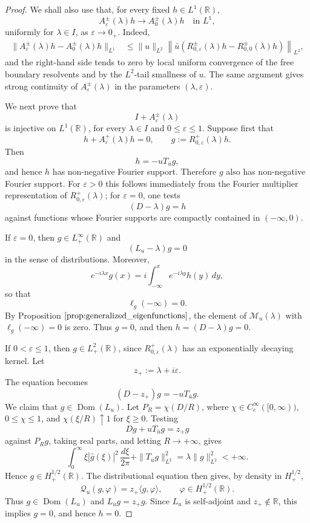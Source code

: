 \documentclass[10pt]{article}
\numberwithin{equation}{section}
\numberwithin{theorem}{section}
\begin{document}
\begin{proof}
We shall also use that, for every fixed \(h\in L^1(\mathbb R)\),
\[
A_{\varepsilon}^{\pm}(\lambda)h
\longrightarrow
A_{0}^{\pm}(\lambda)h
\quad\text{in }L^1,
\]
uniformly for \(\lambda\in I\), as \(\varepsilon\to0_+\). Indeed,
\[
\begin{aligned}
\|A_{\varepsilon}^{\pm}(\lambda)h
-
A_0^\pm(\lambda)h\|_{L^1}
&\leq
\|u\|_{L^2}
\left\|
\bar u
\left(
R_{0,\varepsilon}^{\pm}(\lambda)h
-
R_{0,0}^{\pm}(\lambda)h
\right)
\right\|_{L^2},
\end{aligned}
\]
and the right-hand side tends to zero by local uniform convergence of the free
boundary resolvents and by the \(L^2\)-tail smallness of \(u\). The same argument
gives strong continuity of \(A_{\varepsilon}^{\pm}(\lambda)\) in the parameters
\((\lambda,\varepsilon)\).

We next prove that
\[
I+A_{\varepsilon}^{\pm}(\lambda)
\]
is injective on \(L^1(\mathbb R)\), for every
\(\lambda\in I\) and \(0\leq\varepsilon\leq1\). Suppose first that
\[
h+A_{\varepsilon}^{+}(\lambda)h=0,
\qquad
g:=R_{0,\varepsilon}^{+}(\lambda)h.
\]
Then
\[
h=-uT_{\bar u}g,
\]
and hence \(h\) has non-negative Fourier support. Therefore \(g\) also has
non-negative Fourier support. For \(\varepsilon>0\) this follows immediately
from the Fourier multiplier representation of \(R_{0,\varepsilon}^{+}(\lambda)\);
for \(\varepsilon=0\), one tests
\[
(D-\lambda)g=h
\]
against functions whose Fourier supports are compactly contained in
\((-\infty,0)\).

If \(\varepsilon=0\), then \(g\in L^\infty_+(\mathbb R)\) and
\[
(L_u-\lambda)g=0
\]
in the sense of distributions. Moreover,
\[
e^{-i\lambda x}g(x)
=
i\int_{-\infty}^x e^{-i\lambda y}h(y)\,dy,
\]
so that
\[
\ell_g(-\infty)=0.
\]
By Proposition \(\ref{prop:generalized_eigenfunctions}\), the element of
\(\mathscr M_u(\lambda)\) with \(\ell_g(-\infty)=0\) is zero. Thus \(g=0\), and
then \(h=(D-\lambda)g=0\).

If \(0<\varepsilon\leq1\), then \(g\in L^2_+(\mathbb R)\), since
\(R_{0,\varepsilon}^{+}(\lambda)\) has an exponentially decaying kernel. Let
\[
z_+:=\lambda+i\varepsilon .
\]
The equation becomes
\[
(D-z_+)g=-uT_{\bar u}g.
\]
We claim that \(g\in\operatorname{Dom}(L_u)\). Let
\(P_R=\chi(D/R)\), where \(\chi\in C_c^\infty([0,\infty))\),
\(0\leq\chi\leq1\), and \(\chi(\xi/R)\uparrow1\) for \(\xi\ge0\). Testing
\[
Dg+uT_{\bar u}g=z_+g
\]
against \(P_Rg\), taking real parts, and letting \(R\to+\infty\), gives
\[
\int_0^\infty
\xi|\widehat g(\xi)|^2\,\frac{d\xi}{2\pi}
+
\|T_{\bar u}g\|_{L^2}^2
=
\lambda\|g\|_{L^2}^2
<+\infty.
\]
Hence \(g\in H^{1/2}_+(\mathbb R)\). The distributional equation then gives,
by density in \(H^{1/2}_+\),
\[
\mathcal Q_u(g,\varphi)
=
z_+\langle g,\varphi\rangle,
\qquad
\varphi\in H^{1/2}_+(\mathbb R).
\]
Thus \(g\in\operatorname{Dom}(L_u)\) and \(L_ug=z_+g\). Since \(L_u\) is
self-adjoint and \(z_+\notin\mathbb R\), this implies \(g=0\), and hence
\(h=0\).


\end{proof}
\end{document}
